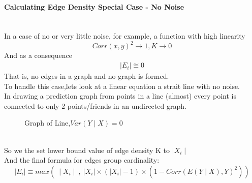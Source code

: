 \documentclass[a4paper]{article}
\begin{document}
\paragraph{Calculating Edge Density Special Case - No Noise} \hspace{0pt}\\
In a case of  no or very little noise, for example, a function with high linearity  
\begin{equation}
Corr(x,y)^2 \longrightarrow 1,K \longrightarrow 0
\end{equation}
And as a consequence 
\begin{align*}
| E_i |\cong 0
\end{align*}
That is, no edges in a graph and no graph is formed.\\
To handle this case,lets look at a linear equation a strait line with no noise.\\
In drawing a prediction graph from points in a line (almost) every point is connected to only 2 points/friends in an undirected graph.
\begin{figure}[ht]
\centering
{}
\caption[Optional caption for list of figures]{Graph of Line,$Var(Y \mid X)=0$
 }
\label{fig:subfigureExample}
\end{figure}\\
So we the set lower bound value of edge density K to $\mid X_i\mid $\\
And the final formula for edges group cardinality:
\begin{equation}
\mid E_i \mid  \equiv max(\ \mid X_i\mid\  ,\  |X_i|\times (|X_i|-1) \times (1 -Corr(E(Y\mid X),Y)^2))
\end{equation}
\end{document}
